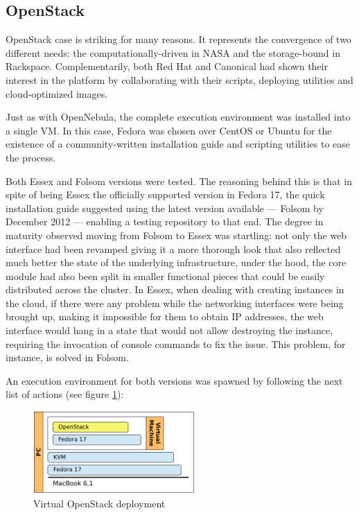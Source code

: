 \subsection{OpenStack}\label{subsec:openstack}

\noindent OpenStack case is striking for many reasons. It represents the convergence of two different needs: the computationally-driven in NASA and the storage-bound in Rackspace. Complementarily, both Red Hat and Canonical had shown their interest in the platform by collaborating with their scripts, deploying utilities and cloud-optimized images.

Just as with OpenNebula, the complete execution environment was installed into a single VM. In this case, Fedora was chosen over CentOS or Ubuntu for the existence of a community-written installation guide \cite{quickstartfedoraos} and scripting utilities to ease the process.

Both Essex and Folsom versions were tested. The reasoning behind this is that in spite of being Essex the officially supported version in Fedora 17, the quick installation guide suggested using the latest version available --- Folsom by December 2012 --- enabling a testing repository to that end. The degree in maturity observed moving from Folsom to Essex was startling: not only the web interface had been revamped giving it a more thorough look that also reflected much better the state of the underlying infrastructure, under the hood, the core module had also been split in smaller functional pieces that could be easily distributed across the cluster. In Essex, when dealing with creating instances in the cloud, if there were any problem while the networking interfaces were being brought up, making it impossible for them to obtain IP addresses, the web interface would hang in a state that would not allow destroying the instance, requiring the invocation of console commands to fix the issue. This problem, for instance, is solved in Folsom.

An execution environment for both versions was spawned by following the next list of actions (see figure \ref{fig:openstack}):

\begin{figure}[tbp]
\begin{center}
\includegraphics[width=0.55\textwidth]{imagenes/010.pdf}
 \caption{Virtual OpenStack deployment}
\label{fig:openstack}
\end{center}
\end{figure}

